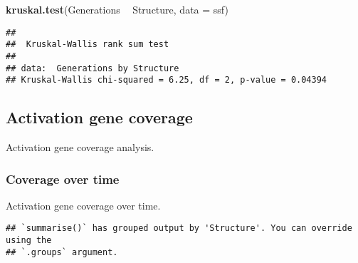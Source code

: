 \documentclass[]{book}
\newenvironment{Shaded}{\begin{snugshade}}{\end{snugshade}}
\newcommand{\CharTok}[1]{\textcolor[rgb]{0.31,0.60,0.02}{#1}}
\newcommand{\CommentTok}[1]{\textcolor[rgb]{0.56,0.35,0.01}{\textit{#1}}}
\newcommand{\DataTypeTok}[1]{\textcolor[rgb]{0.13,0.29,0.53}{#1}}
\newcommand{\KeywordTok}[1]{\textcolor[rgb]{0.13,0.29,0.53}{\textbf{#1}}}
\newcommand{\NormalTok}[1]{#1}
\newcommand{\OperatorTok}[1]{\textcolor[rgb]{0.81,0.36,0.00}{\textbf{#1}}}
\newcommand{\StringTok}[1]{\textcolor[rgb]{0.31,0.60,0.02}{#1}}
\begin{document}
\begin{Shaded}
\begin{Highlighting}[]
\KeywordTok{kruskal.test}\NormalTok{(Generations }\OperatorTok{~}\StringTok{ }\NormalTok{Structure, }\DataTypeTok{data =}\NormalTok{ ssf)}
\end{Highlighting}
\end{Shaded}

\begin{verbatim}
## 
##  Kruskal-Wallis rank sum test
## 
## data:  Generations by Structure
## Kruskal-Wallis chi-squared = 6.25, df = 2, p-value = 0.04394
\end{verbatim}

\hypertarget{activation-gene-coverage-9}{%
\subsection{Activation gene coverage}\label{activation-gene-coverage-9}}

Activation gene coverage analysis.

\hypertarget{coverage-over-time-15}{%
\subsubsection{Coverage over time}\label{coverage-over-time-15}}

Activation gene coverage over time.

\begin{Shaded}
\end{Shaded}

\begin{verbatim}
## `summarise()` has grouped output by 'Structure'. You can override using the
## `.groups` argument.
\end{verbatim}
\end{document}
